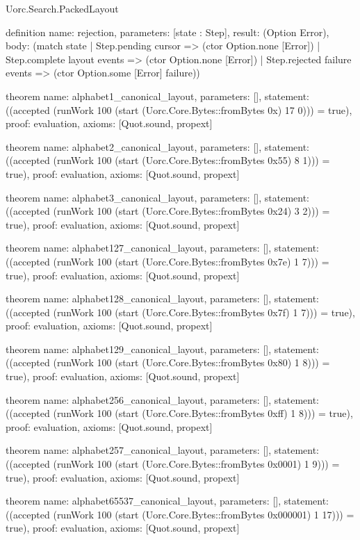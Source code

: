 \begin{lexlean}{Uorc.Search.PackedLayout}
\begin{semanticmodule}
definition{
  name: rejection,
  parameters: [state : Step],
  result: (Option Error),
  body: (match state
    | Step.pending cursor => (ctor Option.none [Error])
    | Step.complete layout events => (ctor Option.none [Error])
    | Step.rejected failure events => (ctor Option.some [Error] failure))
}

theorem{
  name: alphabet1_canonical_layout,
  parameters: [],
  statement: ((accepted (runWork 100 (start (Uorc.Core.Bytes::fromBytes 0x) 17 0))) = true),
  proof: evaluation{},
  axioms: [Quot.sound, propext]
}

theorem{
  name: alphabet2_canonical_layout,
  parameters: [],
  statement: ((accepted (runWork 100 (start (Uorc.Core.Bytes::fromBytes 0x55) 8 1))) = true),
  proof: evaluation{},
  axioms: [Quot.sound, propext]
}

theorem{
  name: alphabet3_canonical_layout,
  parameters: [],
  statement: ((accepted (runWork 100 (start (Uorc.Core.Bytes::fromBytes 0x24) 3 2))) = true),
  proof: evaluation{},
  axioms: [Quot.sound, propext]
}

theorem{
  name: alphabet127_canonical_layout,
  parameters: [],
  statement: ((accepted (runWork 100 (start (Uorc.Core.Bytes::fromBytes 0x7e) 1 7))) = true),
  proof: evaluation{},
  axioms: [Quot.sound, propext]
}

theorem{
  name: alphabet128_canonical_layout,
  parameters: [],
  statement: ((accepted (runWork 100 (start (Uorc.Core.Bytes::fromBytes 0x7f) 1 7))) = true),
  proof: evaluation{},
  axioms: [Quot.sound, propext]
}

theorem{
  name: alphabet129_canonical_layout,
  parameters: [],
  statement: ((accepted (runWork 100 (start (Uorc.Core.Bytes::fromBytes 0x80) 1 8))) = true),
  proof: evaluation{},
  axioms: [Quot.sound, propext]
}

theorem{
  name: alphabet256_canonical_layout,
  parameters: [],
  statement: ((accepted (runWork 100 (start (Uorc.Core.Bytes::fromBytes 0xff) 1 8))) = true),
  proof: evaluation{},
  axioms: [Quot.sound, propext]
}

theorem{
  name: alphabet257_canonical_layout,
  parameters: [],
  statement: ((accepted (runWork 100 (start (Uorc.Core.Bytes::fromBytes 0x0001) 1 9))) = true),
  proof: evaluation{},
  axioms: [Quot.sound, propext]
}

theorem{
  name: alphabet65537_canonical_layout,
  parameters: [],
  statement: ((accepted (runWork 100 (start (Uorc.Core.Bytes::fromBytes 0x000001) 1 17))) = true),
  proof: evaluation{},
  axioms: [Quot.sound, propext]
}


\end{semanticmodule}
\end{lexlean}
